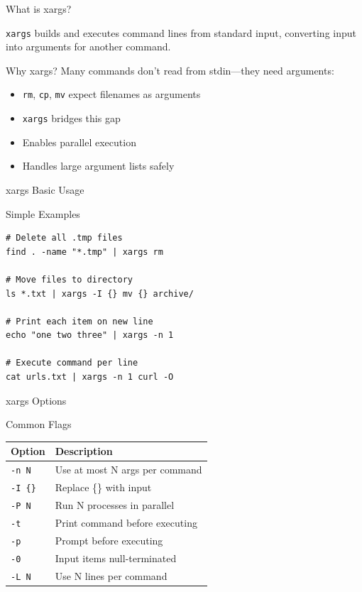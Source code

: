 \documentclass[presentation,aspectratio=1610]{beamer}
\begin{document}
\begin{frame}[label={sec:orgd647937},fragile]{What is xargs?}
 \begin{definition}[Definition]\label{sec:orgc927895}
\texttt{xargs} builds and executes command lines from standard input, converting input into arguments for another command.
\end{definition}
\begin{block}{Why xargs?}
Many commands don't read from stdin—they need arguments:
\begin{itemize}
\item \texttt{rm}, \texttt{cp}, \texttt{mv} expect filenames as arguments
\item \texttt{xargs} bridges this gap
\item Enables parallel execution
\item Handles large argument lists safely
\end{itemize}
\end{block}
\end{frame}
\begin{frame}[label={sec:orgc4d7c0f},fragile]{xargs Basic Usage}
 \begin{block}{Simple Examples}
\begin{verbatim}
# Delete all .tmp files
find . -name "*.tmp" | xargs rm

# Move files to directory
ls *.txt | xargs -I {} mv {} archive/

# Print each item on new line
echo "one two three" | xargs -n 1

# Execute command per line
cat urls.txt | xargs -n 1 curl -O
\end{verbatim}
\end{block}
\end{frame}
\begin{frame}[label={sec:org227483a},fragile]{xargs Options}
 \begin{block}{Common Flags}
\begin{center}
\begin{tabular}{ll}
Option & Description\\
\hline
\texttt{-n N} & Use at most N args per command\\
\texttt{-I \{\}} & Replace \{\} with input\\
\texttt{-P N} & Run N processes in parallel\\
\texttt{-t} & Print command before executing\\
\texttt{-p} & Prompt before executing\\
\texttt{-0} & Input items null-terminated\\
\texttt{-L N} & Use N lines per command\\
\end{tabular}
\end{center}
\end{block}
\end{frame}
\end{document}
